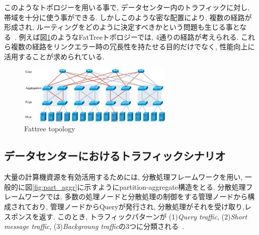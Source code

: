 \documentclass[10pt, a4paper, twocolumn]{jsarticle}
\begin{document}
このようなトポロジーを用いる事で, データセンター内のトラフィックに対し, 帯域を十分に使う事ができる.
しかしこのような密な配置により, 複数の経路が形成され, ルーティングをどのように決定すべきかという問題も生じる事となる~\cite{improving}.
例えば図\ref{fig:fattree}のようなFatTreeトポロジーでは, 4通りの経路が考えられる.
これら複数の経路をリンクエラー時の冗長性を持たせる目的だけでなく, 性能向上に活用することが求められている.
\begin{figure}[h]
    \begin{center}
    \includegraphics[autoebb, width=210pt]{./img/fattree_topology.pdf}
    \caption{Fattree topology}
    \label{fig:fattree}
    \end{center}
\end{figure}


\subsection{データセンターにおけるトラフィックシナリオ}
\label{sec:traffic_scenario}
大量の計算機資源を有効活用するためには,
分散処理フレームワークを用い, 一般的に図\ref{fig:part_aggr}に示すようにpartition-aggregate構造をとる.
分散処理フレームワークでは, 多数の処理ノードと分散処理の制御をする管理ノードから構成されており, 管理ノードからQueryが発行され, 分散処理がそれを受け取り,レスポンスを返す.
このとき, トラフィックパターンが  (1){\it Query traffic}, (2){\it Short message
traffic}, (3){\it Backgroung traffic}の3つに分類される~\cite{dctcp}.
\end{document}
